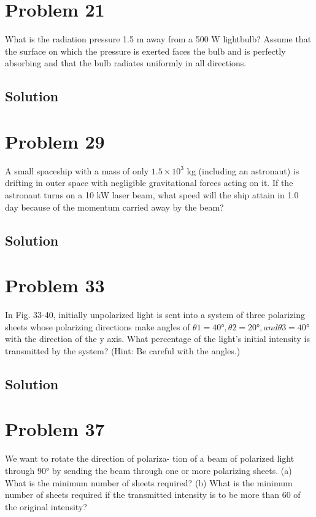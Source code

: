\documentclass[12pt]{article}
\newcommand{\E}[1]{\times 10^{#1}}
\begin{document}
    \pagebreak
    \section{Problem 21}
        What is the radiation pressure 1.5 m away from a 500 W
lightbulb? Assume that the surface on which the pressure is exerted
faces the bulb and is perfectly absorbing and that the bulb radiates
uniformly in all directions.

        \subsection{Solution}

    \pagebreak
    \section{Problem 29}
        A small spaceship with a mass of only $1.5\E{3}$ kg
(including an astronaut) is drifting in outer space with negligible
gravitational forces acting on it. If the astronaut turns on a 10 kW
laser beam, what speed will the ship attain in 1.0 day because of the
momentum carried away by the beam?

        \subsection{Solution}

    \pagebreak
    \section{Problem 33}
        In Fig. 33-40, initially unpolarized light is sent into a
system of three polarizing sheets whose polarizing directions make
angles of $\theta 1 = 40\unit{\degree}, \theta 2 = 20\unit{\degree}, and \theta 3 = 40\unit{\degree}$ with the direction of the
y axis. What percentage of the light's initial intensity is transmitted
by the system? (Hint: Be careful with the angles.)

        \subsection{Solution}

    \pagebreak
    \section{Problem 37}
        We want to rotate the direction of polariza-
tion of a beam of polarized light through 90\unit{\degree} by sending the beam
through one or more polarizing sheets. (a) What is the minimum
number of sheets required? (b) What is the minimum number of
sheets required if the transmitted intensity is to be more than 60%
of the original intensity?
\end{document}
